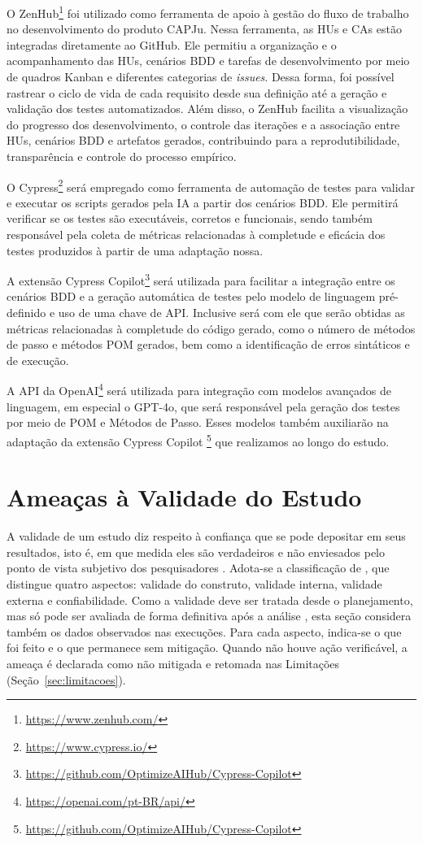 O ZenHub\footnote{\url{https://www.zenhub.com/}}
 foi utilizado como ferramenta de apoio à gestão do fluxo de trabalho no desenvolvimento do produto CAPJu. Nessa ferramenta, as HUs e CAs estão integradas diretamente ao GitHub. Ele permitiu a organização e o acompanhamento das HUs, cenários BDD e tarefas de desenvolvimento por meio de quadros Kanban e diferentes categorias de \textit{issues}. Dessa forma, foi possível rastrear o ciclo de vida de cada requisito desde sua definição até a geração e validação dos testes automatizados. Além disso, o ZenHub facilita a visualização do progresso dos desenvolvimento, o controle das iterações e a associação entre HUs, cenários BDD e artefatos gerados, contribuindo para a reprodutibilidade, transparência e controle do processo empírico.

O Cypress\footnote{\url{https://www.cypress.io/}} será empregado como ferramenta de automação de testes para validar e executar os scripts gerados pela IA a partir dos cenários BDD. Ele permitirá verificar se os testes são executáveis, corretos e funcionais, sendo também responsável pela coleta de métricas relacionadas à completude e eficácia dos testes produzidos à partir de uma adaptação nossa.

A extensão Cypress Copilot\footnote{\url{https://github.com/OptimizeAIHub/Cypress-Copilot}} será utilizada para facilitar a integração entre os cenários BDD e a geração automática de testes pelo modelo de linguagem pré-definido e uso de uma chave de API. Inclusive será com ele que serão obtidas as métricas relacionadas à completude do código gerado, como o número de métodos de passo e métodos POM gerados, bem como a identificação de erros sintáticos e de execução.

A API da OpenAI\footnote{\url{https://openai.com/pt-BR/api/}} será utilizada para integração com modelos avançados de linguagem, em especial o GPT-4o, que será responsável pela geração dos testes por meio de POM e Métodos de Passo. Esses modelos também auxiliarão na adaptação da extensão Cypress Copilot \footnote{\url{https://github.com/OptimizeAIHub/Cypress-Copilot}} que realizamos ao longo do estudo.

\section{Ameaças à Validade do Estudo}
\label{sec:ameacas-validade}

A validade de um estudo diz respeito à confiança que se pode depositar em seus resultados, isto é, em que medida eles são verdadeiros e não enviesados pelo ponto de vista subjetivo dos pesquisadores \cite{runeson2009}. Adota-se a classificação de , que distingue quatro aspectos: validade do construto, validade interna, validade externa e confiabilidade. Como a validade deve ser tratada desde o planejamento, mas só pode ser avaliada de forma definitiva após a análise \cite{runeson2009}, esta seção considera também os dados observados nas execuções. Para cada aspecto, indica-se o que foi feito e o que permanece sem mitigação. Quando não houve ação verificável, a ameaça é declarada como não mitigada e retomada nas Limitações (Seção~\ref{sec:limitacoes}).

